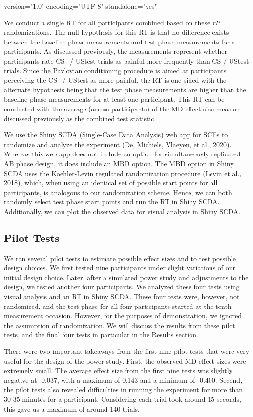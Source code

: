 version="1.0" encoding="UTF-8" standalone="yes" \documentclass{article}
\begin{document}
We conduct a single RT for all participants combined based on these \emph{r}\emph{P} randomizations. The null hypothesis for this RT is that no difference exists between the baseline phase measurements and test phase measurements for all participants. As discussed previously, the measurements represent whether participants rate CS+/ UStest trials as painful more frequently than CS-/ UStest trials. Since the Pavlovian conditioning procedure is aimed at participants perceiving the CS+/ UStest as more painful, the RT is one-sided with the alternate hypothesis being that the test phase measurements are higher than the baseline phase measurements for at least one participant. This RT can be conducted with the average (across participants) of the MD effect size measure discussed previously as the combined test statistic.

We use the Shiny SCDA (Single-Case Data Analysis) web app for SCEs to randomize and analyze the experiment (De, Michiels, Vlaeyen, et al., 2020). Whereas this web app does not include an option for simultaneously replicated AB phase design, it does include an MBD option. The MBD option in Shiny SCDA uses the Koehler-Levin regulated randomization procedure (Levin et al., 2018), which, when using an identical set of possible start points for all participants, is analogous to our randomization scheme. Hence, we can both randomly select test phase start points and run the RT in Shiny SCDA. Additionally, we can plot the observed data for visual analysis in Shiny SCDA. 

\subsection{Pilot Tests}

We ran several pilot tests to estimate possible effect sizes and to test possible design choices. We first tested nine participants under slight variations of our initial design choice. Later, after a simulated power study and adjustments to the design, we tested another four participants. We analyzed these four tests using visual analysis and an RT in Shiny SCDA. These four tests were, however, not randomized, and the test phase for all four participants started at the tenth measurement occasion. However, for the purposes of demonstration, we ignored the assumption of randomization. We will discuss the results from these pilot tests, and the final four tests in particular in the Results section. 

There were two important takeaways from the first nine pilot tests that were very useful for the design of the power study. First, the observed MD effect sizes were extremely small. The average effect size from the first nine tests was slightly negative at -0.037, with a maximum of 0.143 and a minimum of -0.400. Second, the pilot tests also revealed difficulties in running the experiment for more than 30-35 minutes for a participant. Considering each trial took around 15 seconds, this gave us a maximum of around 140 trials.
\end{document}
